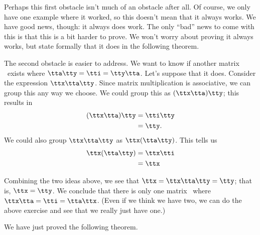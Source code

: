 Perhaps this first obstacle isn't much of an obstacle after all. Of course, we only have one example where it worked, so this doesn't mean that it always works. We have good news, though: it always does work. The only ``bad'' news to come with this is that this is a bit harder to prove. We won't worry about proving it always works, but state formally that it does in the following theorem.

\smallskip


\smallskip

The second obstacle is easier to address. We want to know if another matrix \tty\ exists where $\tta\tty = \tti =\tty\tta$. Let's suppose that it does. Consider the expression $\ttx\tta\tty$. Since matrix multiplication is associative, we can group this any way we choose. We could group this as $(\ttx\tta)\tty$; this results in 
\begin{align*}
(\ttx\tta)\tty	&= \tti\tty\\
								&= \tty.
\end{align*}
We could also group $\ttx\tta\tty$ as $\ttx(\tta\tty)$. This tells us 
\begin{align*}
\ttx(\tta\tty) &= \ttx\tti\\
		&= \ttx
\end{align*}

Combining the two ideas above, we see that $\ttx = \ttx\tta\tty = \tty$; that is, $\ttx=\tty$. We conclude that there is only one matrix \ttx\ where $\ttx\tta = \tti = \tta\ttx$. (Even if we think we have two, we can do the above exercise and see that we really just have one.)

We have just proved the following theorem.

\smallskip


